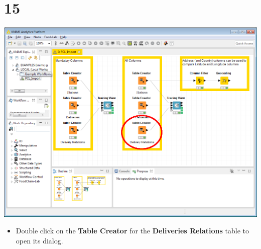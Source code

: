 \documentclass{beamer}
\begin{document}
\section{15}
\begin{frame}
	\begin{center}
  		\includegraphics[height=0.6\textheight]{15.png}
	\end{center}
	\begin{itemize}
		\item Double click on the \textbf{Table Creator} for the \textbf{Deliveries Relations} table to open its dialog.
	\end{itemize}
\end{frame}
\end{document}
